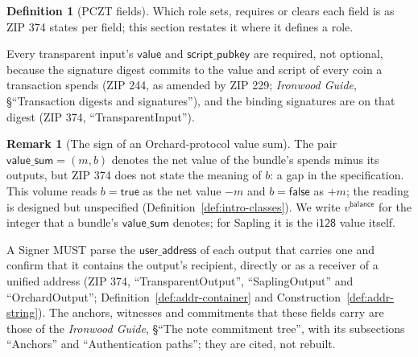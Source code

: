 \documentclass[11pt,a4paper]{article}
\theoremstyle{definition}
\newtheorem{definition}[theorem]{Definition}
\newtheorem{remark}[theorem]{Remark}
\newcommand{\cmx}{\mathsf{cmx}}
\newcommand{\aksym}{\ensuremath{\mathsf{ak}}}
\newcommand{\nksym}{\ensuremath{\mathsf{nk}}}
\newcommand{\rivk}{\ensuremath{\mathsf{r_{ivk}}}}
\begin{document}
\begin{definition}[PCZT fields]
{
}
Which role sets, requires or clears each field is as ZIP 374 states per
field; this section restates it where it defines a role.
\end{definition}

Every transparent input's $\mathsf{value}$ and $\mathsf{script\_pubkey}$ are
required, not optional, because the signature digest commits to the value
and script of every coin a transaction spends (ZIP 244, as amended by ZIP
229; \emph{Ironwood Guide}, \S``Transaction digests and signatures''), and
the binding signatures are on that digest (ZIP 374, ``TransparentInput'').

\begin{remark}[The sign of an Orchard-protocol value sum]
The pair $\mathsf{value\_sum} = (m, b)$ denotes the net value of the
bundle's spends minus its outputs, but ZIP 374 does not state the meaning
of $b$: a gap in the specification. This volume reads $b = \mathsf{true}$
as the net value $-m$ and $b = \mathsf{false}$ as $+m$; the reading is
designed but unspecified (Definition~\ref{def:intro-classes}). We write
$v^{\mathsf{balance}}$ for the integer that a bundle's $\mathsf{value\_sum}$
denotes; for Sapling it is the $\mathsf{i128}$ value itself.
\end{remark}

A Signer MUST parse the $\mathsf{user\_address}$ of each output that carries
one and confirm that it contains the output's recipient, directly or as a
receiver of a unified address (ZIP 374, ``TransparentOutput'',
``SaplingOutput'' and ``OrchardOutput''; Definition~\ref{def:addr-container}
and Construction~\ref{def:addr-string}). The anchors, witnesses and
commitments that these fields carry are those of the \emph{Ironwood Guide},
\S``The note commitment tree'', with its subsections ``Anchors'' and
``Authentication paths''; they are cited, not rebuilt.
\end{document}
